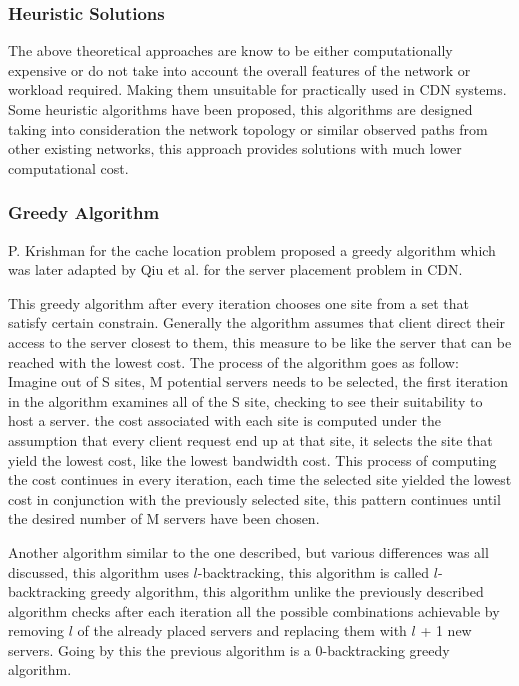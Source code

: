 \subsubsection{Heuristic Solutions}
The above theoretical approaches are know to be either computationally expensive or do not take into account the overall features of the network or workload required. Making them unsuitable for practically used in CDN systems\cite{radoslavovtopology}. Some heuristic algorithms have been proposed, this algorithms are designed taking into consideration the network topology or similar observed paths from other existing networks\cite{krishnancache}\cite{qiuplacement}\cite{jaminconstrained}\cite{radoslavovtopology}, this approach provides solutions with much lower computational cost. 

\subsubsection{Greedy Algorithm}
P. Krishman\cite{krishnancache} for the cache location problem proposed a greedy algorithm which was later adapted by Qiu et al.\cite{qiuplacement} for the server placement problem in CDN.

This greedy algorithm after every iteration chooses one site from a set that satisfy certain constrain. Generally the algorithm assumes that client direct their access to the server closest to them, this measure to be like the server that can be reached with the lowest cost.
The process of the algorithm goes as follow: Imagine out of S sites, M potential servers needs to be selected, the first iteration in the algorithm examines all of the S site,
checking to see their suitability to host a server. the cost associated with each site is computed under the assumption that every client request end up at that site, it selects the site that yield the lowest cost, like the lowest bandwidth cost. This process of computing the cost continues in every iteration, each time the selected site yielded the lowest cost in conjunction with the  previously selected site, this pattern continues until the desired number of M servers have been chosen. 

Another algorithm similar to the one described, but various differences was all discussed, this algorithm uses ${l}$-backtracking, this algorithm is called ${l}$-backtracking greedy algorithm, this algorithm unlike the previously described algorithm checks after each iteration all the possible combinations achievable by removing ${l}$ of the already placed servers and replacing them with ${l}$ + 1 new servers. Going by this the previous algorithm is a 0-backtracking greedy algorithm. 

